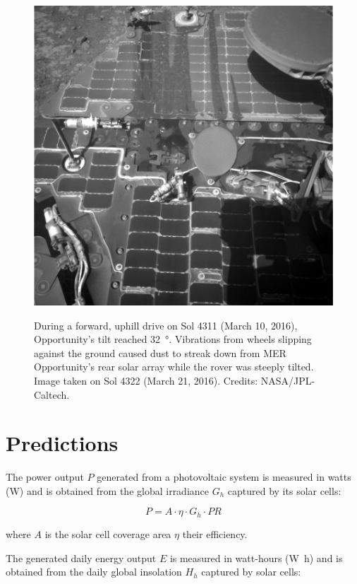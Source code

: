 \begin{figure}[h]
  \centering
  \hypersetup{linkcolor=captionTextColor}
  \includegraphics[width=0.6\linewidth]{sections/power-and-energy-predictions/images/mer-opportunity-dust-streaks.png}\\
  \caption[Streak of dust on MER Opportunity's rear solar array during a steep tilt]
          {During a forward, uphill drive on Sol 4311 (March 10, 2016), Opportunity's tilt reached \SI{32}{\degree}. Vibrations from wheels slipping against the ground caused dust to streak down from MER Opportunity's rear solar array while the rover was steeply tilted. Image taken on Sol 4322 (March 21, 2016). Credits: NASA/JPL-Caltech.}
  \label{fig:image:mer-opportunity-dust-streaks}
\end{figure}

\clearpage
\section{Predictions}
\label{sec:PowerAndEnergyPredictions:Predictions}

The power output $P$ generated from a photovoltaic system is measured in watts (\si{\watt}) and is obtained from the global irradiance $G_{h}$ captured by its solar cells:

\begin{equation}
  \label{eq:SA_power}
  P = A \cdot \eta \cdot G_{h} \cdot PR
\end{equation}

where $A$ is the solar cell coverage area $\eta$ their efficiency.

The generated daily energy output $E$ is measured in watt-hours (\si{\watt\hour}) and is obtained from the daily global insolation $H_{h}$ captured by solar cells:

